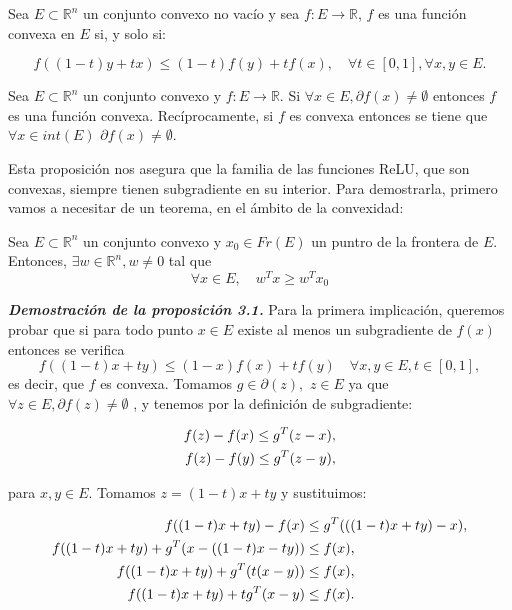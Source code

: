 \begin{definicion}
    Sea $E \subset \mathbb{R}^n$ un conjunto convexo no vacío y sea $f:E \rightarrow \mathbb{R}$, $f$ es una función convexa en $E$ si, y solo si:

    $$f( (1-t)y + tx) \leq (1-t) f(y) + tf(x), \quad \forall t \in [0,1], \forall x,y \in E.$$
\end{definicion}

\begin{proposicion}
\label{prop:subgrad}
    Sea $E \subset \mathbb{R}^n$ un conjunto convexo y $f:E \rightarrow \mathbb{R}$. Si $\forall x \in E, \partial f(x) \neq \emptyset$ entonces $f$ es una función convexa. Recíprocamente, si $f$ es convexa  entonces se tiene que $\forall x \in int(E)$ $\partial f(x) \neq \emptyset$.
\end{proposicion}

Esta proposición nos asegura que la familia de las funciones ReLU, que son convexas, siempre tienen subgradiente en su interior. Para demostrarla, primero vamos a necesitar de un teorema, en el ámbito de la convexidad:

\begin{teorema}
    Sea $E \subset \mathbb{R}^n$ un conjunto convexo y $x_0 \in Fr(E)$ un puntro de la frontera de $E$. Entonces, $\exists w \in \mathbb{R}^n, w \neq 0$ tal que
    $$\forall x \in E, \quad w^Tx \geq w^T x_0$$
\end{teorema}

\textbf{\textit{Demostración de la proposición 3.1.}}
Para la primera implicación, queremos probar que si para todo punto $x \in E$ existe al menos un subgradiente de $f(x)$ entonces se verifica
$$f((1-t)x+ty) \leq (1-x)f(x)+tf(y) \quad \forall x,y \in E, t \in [0,1],$$
es decir, que $f$ es convexa. Tomamos $g \in \partial(z),$ $z \in E$ ya que $\forall z \in E,  \partial f(z) \neq \emptyset $ , y tenemos por la definición de subgradiente:

\begin{align}
	f(z) - f(x) \leq g^T(z-x), \notag \\
	f(z) - f(y) \leq g^T(z-y), \label{eq:des2}
\end{align}

para $x,y \in E$. Tomamos $z=(1-t)x + ty$ y sustituimos:

\begin{align}	
	f((1-t)x + ty) - f(x) &\leq g^T(((1-t)x + ty)-x), \notag \\
	f((1-t)x + ty) + g^T(x - ((1-t)x-ty)) &\leq f(x), \notag \\
	f((1-t)x + ty) + g^T(t(x-y)) &\leq f(x), \notag \\
	f((1-t)x + ty) + tg^T(x-y) &\leq f(x). \label{proof1:f(x)}
\end{align}


